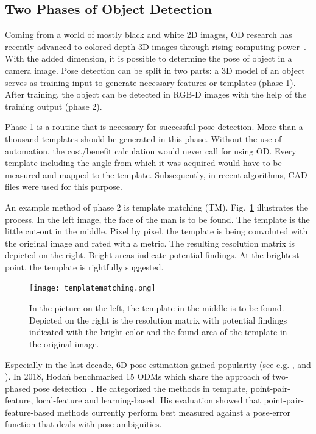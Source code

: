 \subsection{Two Phases of Object Detection}
Coming from a world of mostly black and white 2D images, OD research has recently advanced to colored depth 3D images through rising computing power~\cite{Hornberg2007HandbookVision}. With the added dimension, it is possible to determine the pose of object in a camera image. Pose detection can be split in two parts: a 3D model of an object serves as training input to generate necessary features or templates (phase 1).  After training, the object can be detected in RGB-D images with the help of the training output (phase 2). 

Phase 1 is a routine that is necessary for successful pose detection. More than a thousand templates should be generated in this phase. Without the use of automation, the cost/benefit calculation would never call for using OD. Every template including the angle from which it was acquired would have to be measured and mapped to the template. Subsequently, in recent algorithms, CAD files were used for this purpose. 

An example method of phase 2 is template matching (TM). Fig.~\ref{templatematching} illustrates the process. In the left image, the face of the man is to be found. The template is the little cut-out in the middle. Pixel by pixel, the template is being convoluted with the original image and rated with a metric. The resulting resolution matrix is depicted on the right. Bright areas indicate potential findings. At the brightest point, the template is rightfully suggested.~\cite{OpenCV-Documentation2018Template2018}

\begin{figure}[ht]
	\centering
  \texttt{[image: templatematching.png]}
	\caption[Template Matching]{In the picture on the left, the template in the middle is to be found. Depicted on the right is the resolution matrix with potential findings indicated with the bright color and the found area of the template in the original image.~\cite{OpenCV-Documentation2018Template2018}}
	\label{templatematching}
\end{figure}

Especially in the last decade, 6D pose estimation gained popularity (see e.g. \cite{Drost2010ModelRecognition}, \cite{Sundermeyer2018ImplicitImages} and \cite{Hinterstoisser2013ModelScenes}). In 2018, Hodaň benchmarked 15 ODMs which share the approach of two-phased pose detection~\cite{Hodan2018BOP:Estimation}. He categorized the methods in template, point-pair-feature, local-feature and learning-based. His evaluation showed that point-pair-feature-based methods currently perform best measured against a pose-error function that deals with pose ambiguities.

